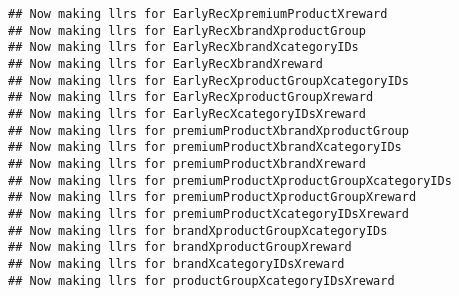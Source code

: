 \documentclass[10pt]{report}
\begin{document}
\begin{verbatim}
## Now making llrs for EarlyRecXpremiumProductXreward
## Now making llrs for EarlyRecXbrandXproductGroup
## Now making llrs for EarlyRecXbrandXcategoryIDs
## Now making llrs for EarlyRecXbrandXreward
## Now making llrs for EarlyRecXproductGroupXcategoryIDs
## Now making llrs for EarlyRecXproductGroupXreward
## Now making llrs for EarlyRecXcategoryIDsXreward
## Now making llrs for premiumProductXbrandXproductGroup
## Now making llrs for premiumProductXbrandXcategoryIDs
## Now making llrs for premiumProductXbrandXreward
## Now making llrs for premiumProductXproductGroupXcategoryIDs
## Now making llrs for premiumProductXproductGroupXreward
## Now making llrs for premiumProductXcategoryIDsXreward
## Now making llrs for brandXproductGroupXcategoryIDs
## Now making llrs for brandXproductGroupXreward
## Now making llrs for brandXcategoryIDsXreward
## Now making llrs for productGroupXcategoryIDsXreward
\end{verbatim}
\end{document}
